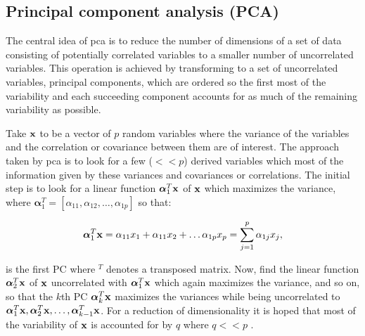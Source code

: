 \subsection{Principal component analysis (PCA)}
The central idea of \DIFdelbegin {}\DIFdelend \DIFaddbegin \gls{pca} \DIFaddend is to reduce the number of dimensions of a set of data consisting of potentially correlated variables to a smaller number of uncorrelated variables. This operation is achieved by transforming to a set of uncorrelated variables, principal components\DIFdelbegin {}\DIFdelend , which are ordered so the first \DIFdelbegin {}\DIFdelend \DIFaddbegin {}\DIFaddend most of the variability and each succeeding component accounts for as much of the remaining variability as possible.

Take $\textrm{\textbf{x}}$ to be a vector of $p$ random variables where the variance of the variables and the correlation or covariance between them are of interest. The approach taken by \DIFdelbegin {}\DIFdelend \DIFaddbegin \gls{pca} \DIFaddend is to look for a few ($<<p$) derived variables which \DIFdelbegin {}\DIFdelend \DIFaddbegin {}\DIFaddend most of the information given by these variances and covariances or correlations. The initial step is to look for a linear function $\boldsymbol\alpha_1^T \textrm{\textbf{x}}$ of $\textrm{\textbf{x}}$ which maximizes the variance, where $\boldsymbol\alpha_1^T =  [\alpha_{1{}1},\alpha_{1{}2},\ldots,\alpha_{1{}p}]$ so that:

\begin{equation}\label{eq:PCAdef}
\boldsymbol\alpha_1^T \textrm{\textbf{x}}= \alpha_{1{}1}x_1 +\alpha_{1{}1} x_2 + \ldots \alpha_{1{}p} x_p = \sum^p_{j=1}\alpha_{1{}j}x_j,
\end{equation}

is the first PC where ${}^T$ denotes a transposed matrix.
Now, find the linear function $\boldsymbol\alpha_2^T \textrm{\textbf{x}}$ of $\textrm{\textbf{x}}$ uncorrelated with $\boldsymbol\alpha_1^T \textrm{\textbf{x}}$ which again maximizes the variance, and so on, so that the $k$th PC $\boldsymbol\alpha_k^T \textrm{\textbf{x}}$ maximizes the variances while being uncorrelated to $\boldsymbol\alpha_1^T \textrm{\textbf{x}}, \boldsymbol\alpha_2^T \textrm{\textbf{x}}, \ldots, \boldsymbol\alpha_{k-1}^T \textrm{\textbf{x}}$. For a reduction of dimensionality it is hoped that most of the variability of $\textrm{\textbf{x}}$ is accounted for by $q$ \DIFdelbegin {}\DIFdelend \DIFaddbegin {}\DIFaddend where $q<<p$ \citep[chap. 1]{Jolliffe1986}.

